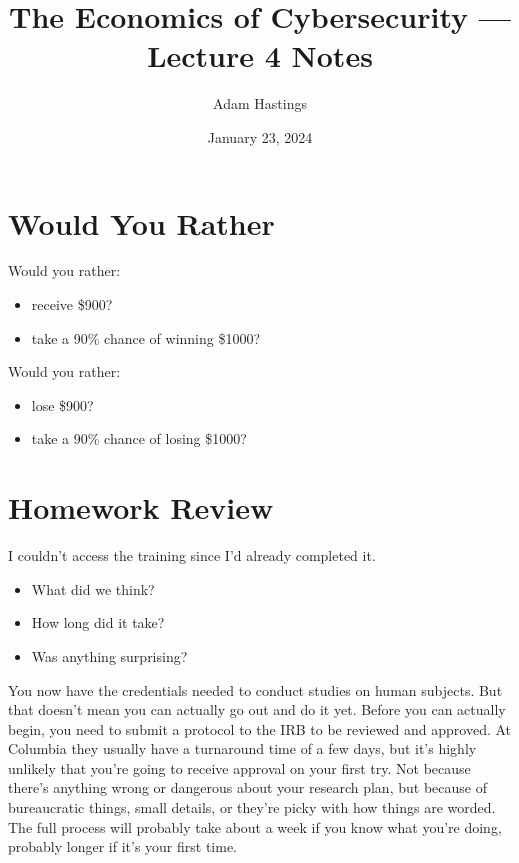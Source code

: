 \documentclass[11pt]{article}
\title{The Economics of Cybersecurity --- Lecture 4 Notes}
\date{January 23, 2024}
\author{Adam Hastings}
\begin{document}
\maketitle

\section{Would You Rather}


Would you rather:
\begin{itemize}
    \item receive \$900?
    \item take a 90\% chance of winning \$1000?
\end{itemize}

Would you rather:
\begin{itemize}
    \item lose \$900?
    \item take a 90\% chance of losing \$1000?
\end{itemize}







\section{Homework Review}

I couldn't access the training since I'd already completed it. 
\begin{itemize}
    \item What did we think?
    \item How long did it take?
    \item Was anything surprising?
\end{itemize}

You now have the credentials needed to conduct studies on human subjects. 
But that doesn't mean you can actually go out and do it yet. 
Before you can actually begin, you need to submit a protocol to the IRB to be reviewed and approved.
At Columbia they usually have a turnaround time of a few days, but it's highly unlikely that you're going to receive approval on your first try. 
Not because there's anything wrong or dangerous about your research plan, but because of bureaucratic things, small details, or they're picky with how things are worded.
The full process will probably take about a week if you know what you're doing, probably longer if it's your first time.
\end{document}
